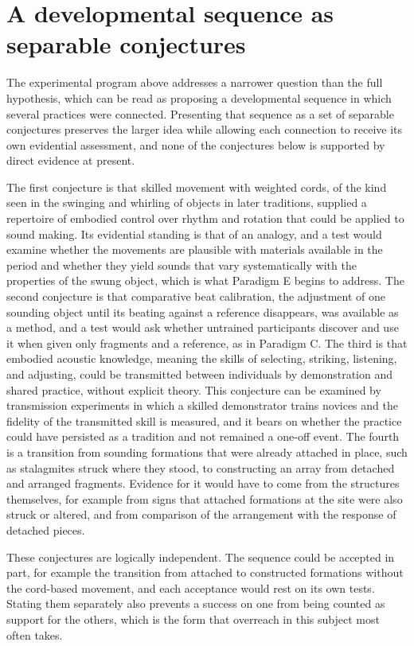 \documentclass[12pt]{article}
\begin{document}
\section{A developmental sequence as separable conjectures}

The experimental program above addresses a narrower question than the full hypothesis, which can be read as proposing a developmental sequence in which several practices were connected. Presenting that sequence as a set of separable conjectures preserves the larger idea while allowing each connection to receive its own evidential assessment, and none of the conjectures below is supported by direct evidence at present.

The first conjecture is that skilled movement with weighted cords, of the kind seen in the swinging and whirling of objects in later traditions, supplied a repertoire of embodied control over rhythm and rotation that could be applied to sound making. Its evidential standing is that of an analogy, and a test would examine whether the movements are plausible with materials available in the period and whether they yield sounds that vary systematically with the properties of the swung object, which is what Paradigm E begins to address. The second conjecture is that comparative beat calibration, the adjustment of one sounding object until its beating against a reference disappears, was available as a method, and a test would ask whether untrained participants discover and use it when given only fragments and a reference, as in Paradigm C. The third is that embodied acoustic knowledge, meaning the skills of selecting, striking, listening, and adjusting, could be transmitted between individuals by demonstration and shared practice, without explicit theory. This conjecture can be examined by transmission experiments in which a skilled demonstrator trains novices and the fidelity of the transmitted skill is measured, and it bears on whether the practice could have persisted as a tradition and not remained a one-off event. The fourth is a transition from sounding formations that were already attached in place, such as stalagmites struck where they stood, to constructing an array from detached and arranged fragments. Evidence for it would have to come from the structures themselves, for example from signs that attached formations at the site were also struck or altered, and from comparison of the arrangement with the response of detached pieces.

These conjectures are logically independent. The sequence could be accepted in part, for example the transition from attached to constructed formations without the cord-based movement, and each acceptance would rest on its own tests. Stating them separately also prevents a success on one from being counted as support for the others, which is the form that overreach in this subject most often takes.
\end{document}
